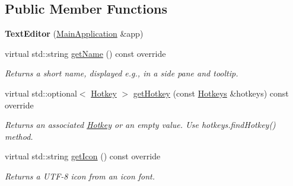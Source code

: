 \subsection*{Public Member Functions}
\begin{DoxyCompactItemize}
\item 
\mbox{\label{classpepr3d_1_1_text_editor_a81990497a4ab26ee3c73f00aa8312fd8}} 
{\bfseries Text\+Editor} (\mbox{\hyperlink{classpepr3d_1_1_main_application}{Main\+Application}} \&app)
\item 
\mbox{\label{classpepr3d_1_1_text_editor_a89d5554aba18be49d5e8f13c1729e3b0}} 
virtual std\+::string \mbox{\hyperlink{classpepr3d_1_1_text_editor_a89d5554aba18be49d5e8f13c1729e3b0}{get\+Name}} () const override
\begin{DoxyCompactList}\small\item\em Returns a short name, displayed e.\+g., in a side pane and tooltip. \end{DoxyCompactList}\item 
\mbox{\label{classpepr3d_1_1_text_editor_a45e0186c35d934adc4af68640074d44e}} 
virtual std\+::optional$<$ \mbox{\hyperlink{structpepr3d_1_1_hotkey}{Hotkey}} $>$ \mbox{\hyperlink{classpepr3d_1_1_text_editor_a45e0186c35d934adc4af68640074d44e}{get\+Hotkey}} (const \mbox{\hyperlink{classpepr3d_1_1_hotkeys}{Hotkeys}} \&hotkeys) const override
\begin{DoxyCompactList}\small\item\em Returns an associated \mbox{\hyperlink{structpepr3d_1_1_hotkey}{Hotkey}} or an empty value. Use hotkeys.\+find\+Hotkey() method. \end{DoxyCompactList}\item 
\mbox{\label{classpepr3d_1_1_text_editor_ad7adaa2d3f7104bface2115407ea3ef3}} 
virtual std\+::string \mbox{\hyperlink{classpepr3d_1_1_text_editor_ad7adaa2d3f7104bface2115407ea3ef3}{get\+Icon}} () const override
\begin{DoxyCompactList}\small\item\em Returns a U\+T\+F-\/8 icon from an icon font. \end{DoxyCompactList}\item 
\mbox{\label{classpepr3d_1_1_text_editor_a0bb2481c00c38ff55eab21baa66624dc}} 

\end{DoxyCompactItemize}
